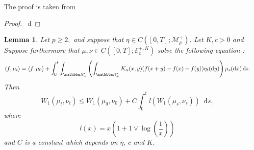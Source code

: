 \documentclass[a4paper,11pt, reqno]{amsart}
\newcommand{\cE}{\mathcal{E}}	\newcommand{\EE}{\mathbbm{E}}
\newcommand{\cM}{\mathcal{M}}	\newcommand{\MM}{\mathbbm{M}}
\newcommand{\dd}{\mathop{}\!\mathrm{d}}
\newcommand{\1}{\mathbbm{1}}
\theoremstyle{plain}
\newtheorem{lemma}[theorem]{Lemma}
\theoremstyle{definition}
\begin{document}
The proof is taken from

\begin{proof}
  \ d
\end{proof}

\begin{lemma}
  Let $p \ge 2,$ and suppose that $\eta \in C ([0, T] ;
  \cM^+_p)$. Let $K, c > 0$ and Suppose furthermore that $\mu, \nu \in
  C ([0, T] ; \cE^{+, K}_c)$ solve the following equation :
  \[ \langle f, \mu_t \rangle = \langle f, \mu_0 \rangle + \int_0^t
     \int_{\RR_+^{\ast}} \left( \int_{\RR^{\ast}_+} K_{\alpha}
     (x, y) (f (x + y) - f (x) - f (y)) \eta_t (\dd y) \right) \mu_s
     (\dd x) \dd s. \]
  Then
  \[ W_1 (\mu_t, \nu_t) \le W_1 (\mu_0, \nu_0) + C \int_0^t l (W_1
     (\mu_s, \nu_s)) \dd s, \]
  where
  \[ l (x) = x \left( 1 + 1 \vee \log \left( \frac{1}{x} \right) \right) \]
  and $C$ is a constant which depends on $\eta$, $c$ and $K$.
\end{lemma}
\end{document}
